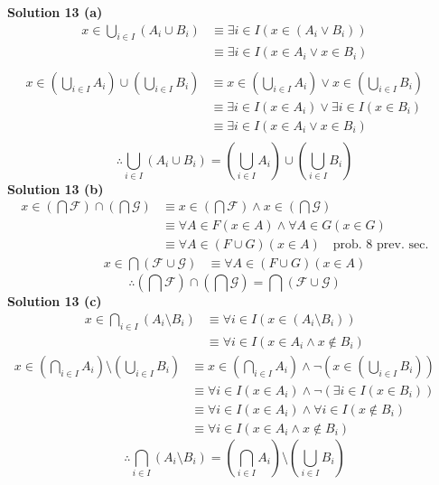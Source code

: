 \textbf{Solution 13 (a)}
\begin{align*}
    x \in \bigcup_{i \in I}(A_i \cup B_i)
        &\equiv \exists{i \in I}(x \in (A_i \vee B_i)) && \\
        &\equiv \exists{i \in I}(x \in A_i \vee x \in B_i) && \\
\end{align*}
\begin{align*}
    x \in \left(\bigcup_{i \in I}A_i\right) \cup \left(\bigcup_{i \in I} B_i\right)
        &\equiv x \in \left(\bigcup_{i \in I}A_i\right) \vee x \in \left(\bigcup_{i \in I} B_i\right) && \\
        &\equiv \exists{i \in I}(x \in A_i) \vee \exists{i \in I}(x \in B_i) && \\
        &\equiv \exists{i \in I}(x \in A_i \vee x \in B_i) && \\
\end{align*}
\[\therefore \bigcup_{i \in I}(A_i \cup B_i) = \left(\bigcup_{i \in I}A_i\right) \cup \left(\bigcup_{i \in I} B_i\right)\]
\textbf{Solution 13 (b)}
\begin{align*}
    x \in \left(\bigcap \mathcal{F}\right) \cap \left(\bigcap \mathcal{G}\right)
        &\equiv x \in \left(\bigcap \mathcal{F}\right) \wedge x \in \left(\bigcap \mathcal{G}\right) && \\
        &\equiv \forall{A \in F}(x \in A) \wedge \forall{A \in G}(x \in G) && \\
        &\equiv \forall{A \in (F \cup G)}(x \in A) \quad \text{prob. $8$ prev. sec.}
\end{align*}
\begin{align*}
    x \in \bigcap(\mathcal{F} \cup \mathcal{G})
        &\equiv \forall{A} \in (F \cup G)(x \in A)
\end{align*}
\[\therefore \left(\bigcap \mathcal{F}\right) \cap \left(\bigcap \mathcal{G}\right) = \bigcap(\mathcal{F} \cup \mathcal{G})\]
\textbf{Solution 13 (c)}
\begin{align*}
    x \in \bigcap_{i \in I}(A_i \setminus B_i)
        &\equiv \forall{i \in I}(x \in (A_i \setminus B_i)) && \\
        &\equiv \forall{i \in I}(x \in A_i \wedge x \not \in B_i)
\end{align*}
\begin{align*}
    x \in \left(\bigcap_{i \in I} A_i\right) \setminus \left(\bigcup_{i \in I} B_i\right) 
        &\equiv x \in \left(\bigcap_{i \in I} A_i\right) \wedge \neg(x \in \left(\bigcup_{i \in I} B_i\right)) && \\
        &\equiv \forall{i \in I}(x \in A_i) \wedge \neg(\exists{i \in I}(x \in B_i)) && \\
        &\equiv \forall{i \in I}(x \in A_i) \wedge \forall{i \in I}(x \not \in B_i) && \\
        &\equiv \forall{i \in I}(x \in A_i \wedge x \not \in B_i) 
\end{align*}
\[\therefore \bigcap_{i \in I}(A_i \setminus B_i) = \left(\bigcap_{i \in I} A_i\right) \setminus \left(\bigcup_{i \in I} B_i\right)\]

